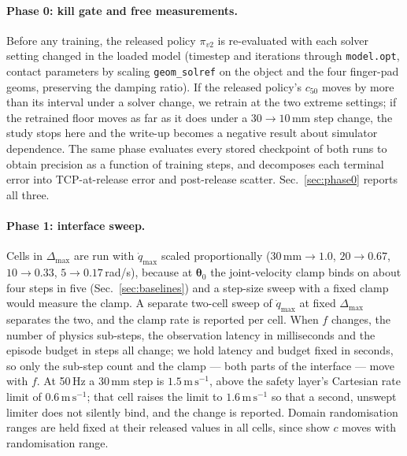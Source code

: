 \documentclass{article}
\newcommand{\dmax}{\Delta_{\max}}
\newcommand{\qdmax}{\dot q_{\max}}
\newcommand{\iface}{\boldsymbol{\theta}}
\begin{document}
\paragraph{Phase 0: kill gate and free measurements.}
Before any training, the released policy $\pi_{v2}$ is re-evaluated with each
solver setting changed in the loaded model (timestep and iterations through
\texttt{model.opt}, contact parameters by scaling \texttt{geom\_solref} on the
object and the four finger-pad geoms, preserving the damping ratio). If the
released policy's $c_{50}$ moves by more than its interval under a solver
change, we retrain at the two extreme settings; if the retrained floor moves as
far as it does under a $30\to10$\,mm step change, the study stops here and the
write-up becomes a negative result about simulator dependence. The same phase
evaluates every stored checkpoint of both runs to obtain precision as a function
of training steps, and decomposes each terminal error into TCP-at-release error
and post-release scatter. Sec.~\ref{sec:phase0} reports all three.

\paragraph{Phase 1: interface sweep.}
Cells in $\dmax$ are run with $\qdmax$ scaled proportionally
($30\,\mathrm{mm}\to1.0$, $20\to0.67$, $10\to0.33$, $5\to0.17$\,rad/s), because
at $\iface_0$ the joint-velocity clamp binds on about four steps in five
(Sec.~\ref{sec:baselines}) and a step-size sweep with a fixed clamp would
measure the clamp. A separate two-cell sweep of $\qdmax$ at fixed $\dmax$
separates the two, and the clamp rate is reported per cell. When $f$ changes,
the number of physics sub-steps, the observation latency in milliseconds and the
episode budget in steps all change; we hold latency and budget fixed in seconds,
so only the sub-step count and the clamp --- both parts of the interface --- move
with $f$. At 50\,Hz a 30\,mm step is $1.5\,\mathrm{m\,s^{-1}}$, above the
safety layer's Cartesian rate limit of $0.6\,\mathrm{m\,s^{-1}}$; that cell
raises the limit to $1.6\,\mathrm{m\,s^{-1}}$ so that a second, unswept limiter
does not silently bind, and the change is reported. Domain randomisation ranges
are held fixed at their released values in all cells, since
\citet{xu2026curse} show $c$ moves with randomisation range.
\end{document}
